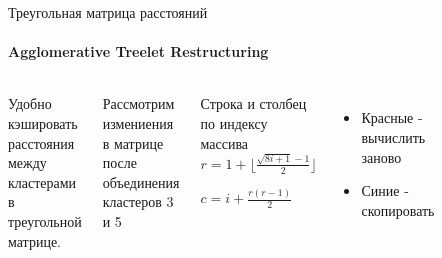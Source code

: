 \documentclass{beamer}
\begin{document}
\begin{frame}{Треугольная матрица расстояний}
    \framesubtitle{Agglomerative Treelet Restructuring}
    \begin{columns}
        Удобно кэшировать расстояния между кластерами в треугольной матрице.

        Рассмотрим измениения в матрице после объединения кластеров 3 и 5
        \begin{block}{Строка и столбец по индексу массива}
            $r = 1 + \lfloor \frac{\sqrt{8i + 1}-1}{2} \rfloor$

            $c = i + \frac{r(r-1)}{2}$
        \end{block}

        \begin{itemize}
            \item 
                Красные - вычислить заново
            \item 
                Синие - скопировать
        \end{itemize}
        \begin{figure}

\end{figure}
\end{columns}
\end{frame}
\end{document}
